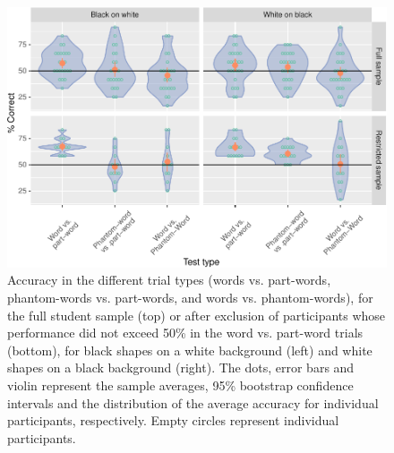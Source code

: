 \documentclass[
]{article}
\begin{document}
\begin{figure}

{\centering \includegraphics[width=0.8\linewidth]{vsl_phamtoms_simultaneous_results_files/figure-latex/vsl-simultaneous-fa-plot-accuracy-plot-by-polarity-city-1} 

}

\caption{Accuracy in the different trial types (words vs. part-words, phantom-words vs. part-words, and words vs. phantom-words), for the full student sample (top) or after exclusion of participants whose performance did not exceed 50\% in the word vs. part-word trials (bottom), for black shapes on a white background (left) and white shapes on a black background (right). The dots, error bars and violin represent the sample averages, 95\% bootstrap confidence intervals and the distribution of the average accuracy for individual participants, respectively. Empty circles represent individual participants.}\label{fig:vsl-simultaneous-fa-plot-accuracy-plot-by-polarity-city}
\end{figure}
\end{document}
